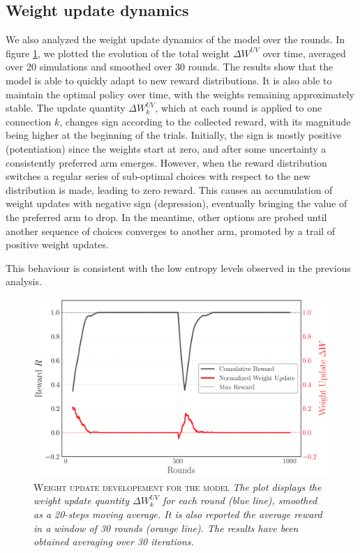 \subsection{Weight update dynamics}
\noindent We also analyzed the weight update dynamics of the model over the rounds.
In figure \ref{fig:rew_update}, we plotted the evolution of the total weight $\Delta W^{UV}$ over time, averaged over 20 simulations and smoothed over 30 rounds.
The results show that the model is able to quickly adapt to new reward distributions. It is also able to maintain the optimal policy over time, with the weights remaining approximately stable.
The update quantity $\Delta W_{k}^{UV}$, which at each round is applied to one connection $k$, changes sign according to the collected reward, with its magnitude being higher at the beginning of the trials.
Initially, the sign is mostly positive (potentiation) since the weights start at zero, and after some uncertainty a consistently preferred arm emerges.
However, when the reward distribution switches a regular series of sub-optimal choices with respect to the new distribution is made, leading to zero reward.
This causes an accumulation of weight updates with negative sign (depression), eventually bringing the value of the preferred arm to drop. In the meantime, other options are probed until another sequence of choices converges to another arm, promoted by a trail of positive weight updates.

This behaviour is consistent with the low entropy levels observed in the previous analysis.


\begin{figure}[H]
    \centering
    \includegraphics[width=1.0\textwidth]{figures/reward_update_plot.png}
    \caption{\textsc{Weight update developement for the model} \textit{The plot displays the weight update quantity $\Delta W_{k}^{UV}$ for each round (blue line), smoothed as a 20-steps moving average.
    It is also reported the average reward in a window of 30 rounds (orange line). The results have been obtained averaging over 30 iterations.}}
    \label{fig:rew_update}
\end{figure}


